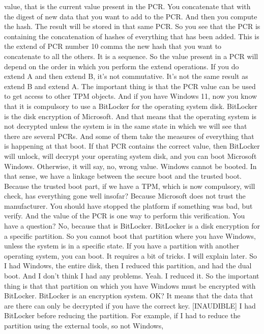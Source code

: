  value, that is the current value present in the PCR. You concatenate that with
 the digest of new data that you want to add to the PCR. And then you compute
 the hash. The result will be stored in that same PCR. So you see that the PCR
 is containing the concatenation of hashes of everything that has been added.
 This is the extend of PCR number 10 comma the new hash that you want to
 concatenate to all the others. It is a sequence. So the value present in a PCR
 will depend on the order in which you perform the extend operations. If you do
 extend A and then extend B, it's not commutative. It's not the same result as
 extend B and extend A. The important thing is that the PCR value can be used
 to get access to other TPM objects. And if you have Windows 11, now you know
 that it is compulsory to use a BitLocker for the operating system disk.
 BitLocker is the disk encryption of Microsoft. And that means that the
 operating system is not decrypted unless the system is in the same state in
 which we will see that there are several PCRs. And some of them take the
 measures of everything that is happening at that boot. If that PCR contains
 the correct value, then BitLocker will unlock, will decrypt your operating
 system disk, and you can boot Microsoft Windows. Otherwise, it will say, no,
 wrong value. Windows cannot be booted. In that sense, we have a linkage
 between the secure boot and the trusted boot. Because the trusted boot part,
 if we have a TPM, which is now compulsory, will check, has everything gone
 well insofar? Because Microsoft does not trust the manufacturer. You should
 have stopped the platform if something was bad, but verify. And the value of
 the PCR is one way to perform this verification. You have a question? No,
 because that is BitLocker. BitLocker is a disk encryption for a specific
 partition. So you cannot boot that partition where you have Windows, unless
 the system is in a specific state. If you have a partition with another
 operating system, you can boot. It requires a bit of tricks. I will explain
 later. So I had Windows, the entire disk, then I reduced this partition, and
 had the dual boot. And I don't think I had any problems. Yeah. I reduced it.
 So the important thing is that that partition on which you have Windows must
 be encrypted with BitLocker. BitLocker is an encryption system. OK? It means
 that the data that are there can only be decrypted if you have the correct
 key. [INAUDIBLE] I had BitLocker before reducing the partition. For example,
 if I had to reduce the partition using the external tools, so not Windows,
